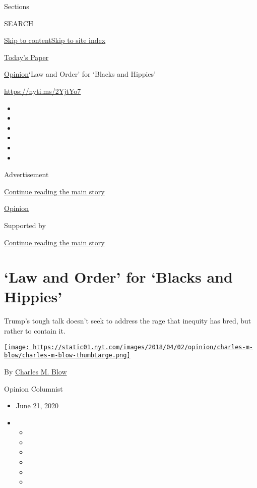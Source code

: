 Sections

SEARCH

\protect\hyperlink{site-content}{Skip to
content}\protect\hyperlink{site-index}{Skip to site index}

\href{https://myaccount.nytimes.com/auth/login?response_type=cookie\&client_id=vi}{}

\href{https://www.nytimes.com/section/todayspaper}{Today's Paper}

\href{/section/opinion}{Opinion}\textbar{}`Law and Order' for `Blacks
and Hippies'

\href{https://nyti.ms/2YjtYo7}{https://nyti.ms/2YjtYo7}

\begin{itemize}
\item
\item
\item
\item
\item
\item
\end{itemize}

Advertisement

\protect\hyperlink{after-top}{Continue reading the main story}

\href{/section/opinion}{Opinion}

Supported by

\protect\hyperlink{after-sponsor}{Continue reading the main story}

\hypertarget{law-and-order-for-blacks-and-hippies}{%
\section{`Law and Order' for `Blacks and
Hippies'}\label{law-and-order-for-blacks-and-hippies}}

Trump's tough talk doesn't seek to address the rage that inequity has
bred, but rather to contain it.

\href{https://www.nytimes.com/by/charles-m-blow}{\texttt{[image: https://static01.nyt.com/images/2018/04/02/opinion/charles-m-blow/charles-m-blow-thumbLarge.png]}}

By \href{https://www.nytimes.com/by/charles-m-blow}{Charles M. Blow}

Opinion Columnist

\begin{itemize}
\item
  June 21, 2020
\item
  \begin{itemize}
  \item
  \item
  \item
  \item
  \item
  \item
  \end{itemize}
\end{itemize}

